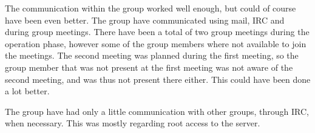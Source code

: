 

The communication within the group worked well enough, but could of course have been even better. The group have communicated using mail, IRC and during group meetings. 
There have been a total of two group meetings during the operation phase, however some of the group members where not available to join the meetings. 
The second meeting was planned during the first meeting, so the group member that was not present at the first meeting was not aware of the second meeting, and was thus not present there either. This could have been done a lot better. 

The group have had only a little communication with other groups, through IRC, when necessary. This was mostly regarding root access to the server. 